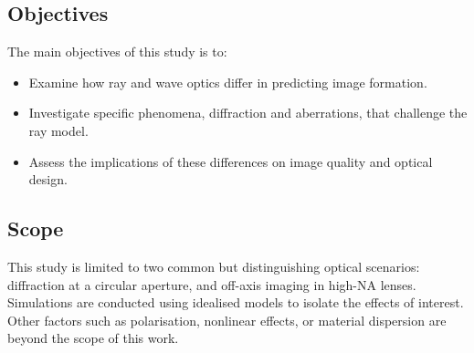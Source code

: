 \begin{multicols}{2}
    \subsection{Objectives}
    The main objectives of this study is to: 
        \begin{itemize}
            \item Examine how ray and wave optics differ in predicting image formation. 
            \item Investigate specific phenomena, diffraction and aberrations, that challenge the ray model. 
            \item Assess the implications of these differences on image quality and optical design.
        \end{itemize}
    \subsection{Scope}
    This study is limited to two common but distinguishing optical scenarios: diffraction at a circular aperture, and off-axis imaging in high-NA lenses. 
    Simulations are conducted using idealised models to isolate the effects of interest. Other factors such as polarisation, nonlinear effects, or material dispersion are beyond
    the scope of this work.
\end{multicols}
